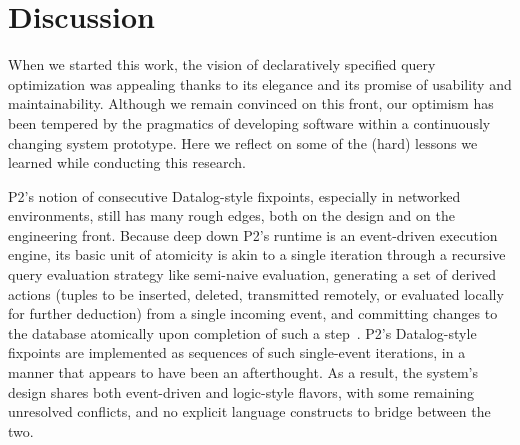 {%

\section{Discussion}
\label{ch:evita:sec:discussion}

When we started this work, the vision of declaratively specified query
optimization was appealing thanks to its elegance and its promise of usability
and maintainability.  Although we remain convinced on this front, our optimism
has been tempered by the pragmatics of developing software within a
continuously changing system prototype.  Here we reflect on some of the (hard)
lessons we learned while conducting this research.

P2's notion of consecutive Datalog-style fixpoints, especially in networked
environments, still has many rough edges, both on the design and on the
engineering front.  Because deep down P2's runtime is an event-driven execution
engine, its basic unit of atomicity is akin to a single iteration through a
recursive query evaluation strategy like semi-naive evaluation, generating a
set of derived actions (tuples to be inserted, deleted, transmitted remotely,
or evaluated locally for further deduction) from a single incoming event, and
committing changes to the database atomically upon completion of such a
step~\cite{LuThesis}.  P2's Datalog-style fixpoints are implemented as
sequences of such single-event iterations, in a manner that appears to have
been an afterthought.  As a result, the system's design shares both
event-driven and logic-style flavors, with some remaining unresolved conflicts,
and no explicit language constructs to bridge between the two.

}
